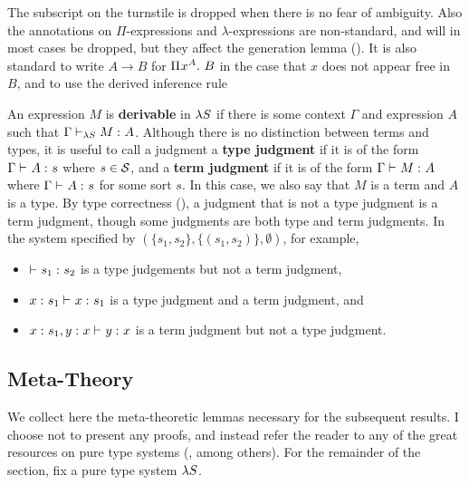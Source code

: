 \documentclass{article}
\begin{document}
The subscript on the turnstile is dropped when there is no fear of ambiguity.
Also the annotations on $\Pi$-expressions and $\lambda$-expressions are non-standard, and will in most cases be dropped, but they affect the generation lemma ().
It is also standard to write $A \to B$ for $\PiT x A B$ in the case that $x$ does not appear free in $B$, and to use the derived inference rule 
\begin{prooftree}
\end{prooftree}

An expression $M$ is \textbf{derivable} in $\lS$ if there is some context $\Gamma$ and expression $A$ such that $\judgment[\lS] \Gamma M A$.
Although there is no distinction between terms and types, it is useful to call a judgment a \textbf{type judgment} if it is of the form $\judgment \Gamma A s$ where $s \in \sorts$, and a \textbf{term judgment} if it is of the form $\judgment \Gamma M A$ where $\judgment \Gamma A s$ for some sort $s$.
In this case, we also say that $M$ is a term and $A$ is a type.
By type correctness (), a judgment that is not a type judgment is a term judgment, though some judgments are both type and term judgments.
In the system specified by $(\{s_1, s_2\}, \{(s_1, s_2)\}, \emptyset)$, for example,
\begin{itemize}
    \item $\judgment {} {s_1} {s_2}$ is a type judgements but not a term judgment,
    \item $\judgment {\statement x {s_1}} x {s_1}$ is a type judgment and a term judgment, and
    \item $\judgment {\statement x {s_1}, \statement y x} y x$ is a term judgment but not a type judgment.
\end{itemize}

\subsection{Meta-Theory}

We collect here the meta-theoretic lemmas necessary for the subsequent results.
I choose not to present any proofs, and instead refer the reader to any of the great resources on pure type systems (\cite{barendregt-1993, barthe-et-al-2001, kamareddine-et-al-2004}, among others).
For the remainder of the section, fix a pure type system $\lS$.
\end{document}
